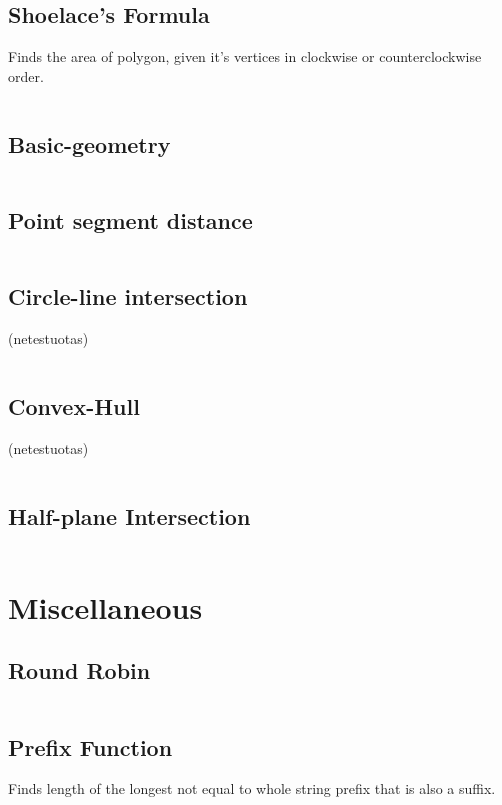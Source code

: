 \documentclass[8pt,a4paper,landscape,oneside]{amsart}
\newcommand{\code}[1]{\inputminted[fontsize=\normalsize,baselinestretch=1]{cpp}{_code/#1}}
\begin{document}
\begin{multicols*}{3}
	\subsection{Shoelace's Formula}
	
	Finds the area of polygon, given it's vertices in clockwise or counterclockwise order.
	
	\code{geometry/shoelace.cpp}

	\subsection{Basic-geometry}
	
	\code{geometry/basic_geometry.cpp}
	
	\subsection{Point segment distance}
	
	\code{geometry/point_segment_distance.cpp}
	
	\subsection{Circle-line intersection}
	
	(netestuotas)
	
	\code{geometry/circle_line_intersection.cpp}
	
	\subsection{Convex-Hull}
	
	(netestuotas)
	
	\code{geometry/convex_hull.cpp}

	\subsection{Half-plane Intersection}
	
	\code{geometry/half_plane_intersection.cpp}
	
\section{Miscellaneous}

	\subsection{Round Robin}

	\code{miscellaneous/round_robin.cpp}
	
	\subsection{Prefix Function}
	
	Finds length of the longest not equal to whole string prefix that is also a suffix.
	
	\code{miscellaneous/prefix_function.cpp}

\end{multicols*}
\end{document}
